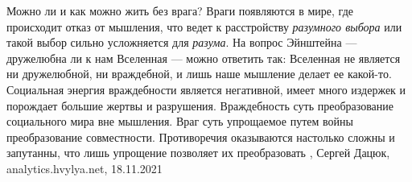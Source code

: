 Можно ли и как можно жить без врага?  Враги появляются в мире, где происходит
отказ от мышления, что ведет к расстройству \emph{разумного выбора} или такой выбор
сильно усложняется для \emph{разума}.  На вопрос Эйнштейна — дружелюбна ли к нам
Вселенная — можно ответить так: Вселенная не является ни дружелюбной, ни
враждебной, и лишь наше мышление делает ее какой-то.  Социальная энергия
враждебности является негативной, имеет много издержек и порождает большие
жертвы и разрушения.  Враждебность суть преобразование социального мира вне
мышления. Враг суть упрощаемое путем войны преобразование совместности.
Противоречия оказываются настолько сложны и запутанны, что лишь упрощение
позволяет их преобразовать
, Сергей Дацюк, analytics.hvylya.net, 18.11.2021
